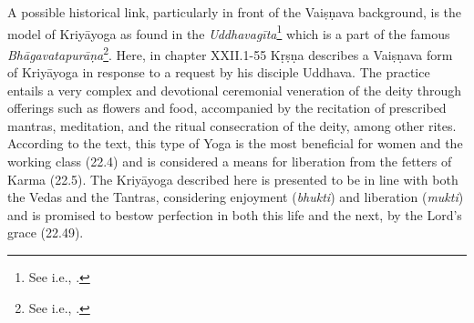 A possible historical link, particularly in front of the Vaiṣṇava background, is the model of Kriyāyoga as found in the \textit{Uddhavagīta}\footnote{See i.e., \citeauthor[2007]{uddhavagita2007}.} which is a part of the famous \textit{Bhāgavatapurāṇa}\footnote{See i.e., \citeauthor[1950]{bhagavata}.}. Here, in chapter XXII.1-55 Kṛṣṇa describes a Vaiṣṇava form of Kriyāyoga in response to a request by his disciple Uddhava. The practice entails a very complex and devotional ceremonial veneration of the deity through offerings such as flowers and food, accompanied by the recitation of prescribed mantras, meditation, and the ritual consecration of the deity, among other rites. According to the text, this type of Yoga is the most beneficial for women and the working class (22.4) and is considered a means for liberation from the fetters of Karma (22.5). The Kriyāyoga described here is presented to be in line with both the Vedas and the Tantras, considering enjoyment (\textit{bhukti}) and liberation (\textit{mukti}) and is promised to bestow perfection in both this life and the next, by the Lord's grace (22.49).  

